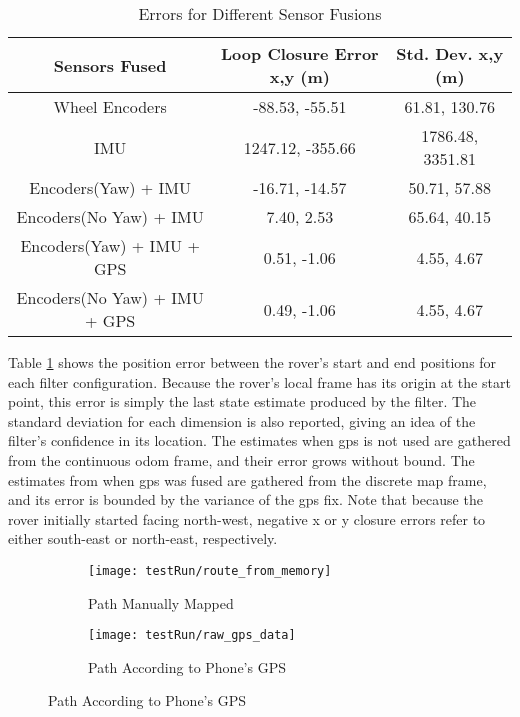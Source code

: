 \begin{table}[h]
	\caption {Errors for Different Sensor Fusions \cite{robot_localization_paper}} \label{tab:errors} 
	\begin{center}
		\begin{tabular}{|c|c|c|} \hline
			\textbf{Sensors Fused} & \textbf{Loop Closure Error x,y (m)} & \textbf{Std. Dev. x,y (m)} \\ \hline
			Wheel Encoders & -88.53, -55.51 & 61.81, 130.76 \\ \hline
			IMU & 
			1247.12, -355.66 &
			1786.48, 3351.81 \\ \hline
			Encoders(Yaw) + IMU &
			-16.71, -14.57 &
			50.71, 57.88  \\
			\hline
			Encoders(No Yaw) + IMU &
			7.40, 2.53 &
			65.64, 40.15  \\
			\hline
			Encoders(Yaw) + IMU + GPS & 0.51, -1.06 & 4.55, 4.67 \\ \hline
			Encoders(No Yaw) + IMU + GPS & 0.49, -1.06 & 4.55, 4.67 \\ \hline
		\end{tabular}
	\end{center}
\end{table}

Table \ref{tab:errors} shows the position error between the rover's start and end positions for each filter configuration. Because the rover's local frame has its origin at the start point, this error is simply the last state estimate produced by the filter. The standard deviation for each dimension is also reported, giving an idea of the filter's confidence in its location. The estimates when gps is not used are gathered from the continuous odom frame, and their error grows without bound. The estimates from when gps was fused are gathered from the discrete map frame, and its error is bounded by the variance of the gps fix. Note that because the rover initially started facing north-west, negative x or y closure errors refer to either south-east or north-east, respectively.

\begin{figure}[p] 
	\caption{
		The Rover's Path
	}
	\label{fig:roverPath}
	\begin{subfigure}{\textwidth}
		\centering
		\texttt{[image: testRun/route\_from\_memory]}
		\caption{Path Manually Mapped}
		\label{figRouteMemory}
	\end{subfigure}
	\begin{subfigure}{\textwidth}
		\centering
		\texttt{[image: testRun/raw\_gps\_data]}
		\caption{Path According to Phone's GPS}
		\label{figRouteGPS}
	\end{subfigure}
	
\end{figure}

